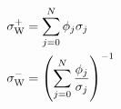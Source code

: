 \begin{equation}
\begin{split}
\sigma_{\rm W}^{+} &= \sum_{j=0}^N \phi_j \sigma_j \\
\sigma_{\rm W}^{-} &= \left(\sum_{j=0}^N \frac{\phi_j}{\sigma_j}\right)^{-1}
\end{split}
\label{eq:wiener_bounds}
\end{equation}

